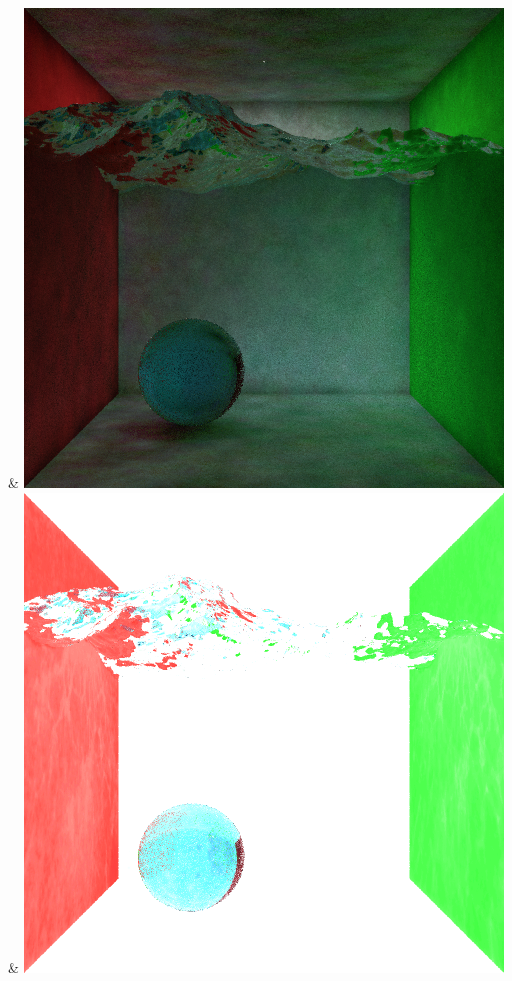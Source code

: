 & \includegraphics[width=\linewidth]{figures/py/tests/quality_comparison/nrc+bt_1spp_caustics_small.png}
& \includegraphics[width=\linewidth]{figures/py/tests/quality_comparison/nrc+lt_1spp_caustics_small.png}
